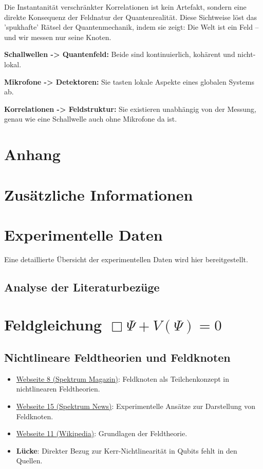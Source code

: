 \documentclass[12pt,a4paper]{article}
\begin{document}
Die Instantanität verschränkter Korrelationen ist kein Artefakt, sondern eine direkte Konsequenz der Feldnatur der Quantenrealität. Diese Sichtweise löst das 'spukhafte' Rätsel der Quantenmechanik, indem sie zeigt: Die Welt ist ein Feld – und wir messen nur seine Knoten.

\textbf{Schallwellen -> Quantenfeld:} Beide sind kontinuierlich, kohärent und nicht-lokal.  

\textbf{Mikrofone -> Detektoren:} Sie tasten lokale Aspekte eines globalen Systems ab.  

\textbf{Korrelationen -> Feldstruktur:} Sie existieren unabhängig von der Messung, genau wie eine Schallwelle auch ohne Mikrofone da ist.
\appendix
\section*{Anhang}

\section{Zusätzliche Informationen}


\section{Experimentelle Daten}
Eine detaillierte Übersicht der experimentellen Daten wird hier bereitgestellt.
\subsection*{Analyse der Literaturbezüge}


	
	\maketitle
	
	\section{Feldgleichung $\Box \Psi + V(\Psi) = 0$} %
	\subsection{Nichtlineare Feldtheorien und Feldknoten}
	\begin{itemize}
		\item \href{https://www.spektrum.de/magazin/feldknoten-als-teilchen/986518}{Webseite 8 (Spektrum Magazin)}: Feldknoten als Teilchenkonzept in nichtlinearen Feldtheorien.
		\item \href{https://www.spektrum.de/news/feldknoten-als-teilchen/981803}{Webseite 15 (Spektrum News)}: Experimentelle Ansätze zur Darstellung von Feldknoten.
		\item \href{https://de.wikipedia.org/wiki/Feldtheorie_(Physik)}{Webseite 11 (Wikipedia)}: Grundlagen der Feldtheorie.
		\item \textbf{Lücke}: Direkter Bezug zur Kerr-Nichtlinearität in Qubits fehlt in den Quellen.
	\end{itemize}
	
\end{document}
